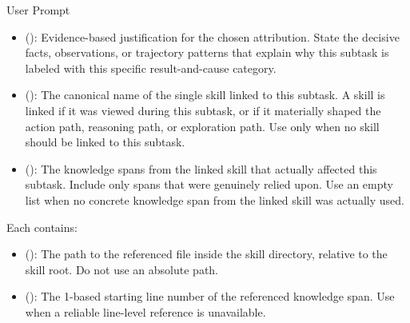 \begin{svpromptbox}{User Prompt}
\begin{itemize}
\begin{itemize}
\item {}: The subtask clearly failed due to some environmental cause, but the evidence is insufficient to distinguish client environment from external environment.
\item {}: The result fundamentally depends on human preference-based review or evaluation, but such judgement is unavailable.
\item {}: Some environment-based signal exists, but it is not sufficient to conclusively establish success or failure for the full goal.
\item {}: No explicit judge signal exists, and the task is not simple enough to be treated as self-evident.
\end{itemize}
\item {} (): Evidence-based justification for the chosen attribution. State the decisive facts, observations, or trajectory patterns that explain why this subtask is labeled with this specific result-and-cause category.
\item {} (): The canonical name of the single skill linked to this subtask. A skill is linked if it was viewed during this subtask, or if it materially shaped the action path, reasoning path, or exploration path. Use  only when no skill should be linked to this subtask.
\item {} (): The knowledge spans from the linked skill that actually affected this subtask. Include only spans that were genuinely relied upon. Use an empty list when no concrete knowledge span from the linked skill was actually used.
\end{itemize}
\smallskip
Each  contains:\par
\smallskip
\begin{itemize}
\item {} (): The path to the referenced file inside the skill directory, relative to the skill root. Do not use an absolute path.
\item {} (): The 1-based starting line number of the referenced knowledge span. Use  when a reliable line-level reference is unavailable.

\end{itemize}
\end{svpromptbox}
